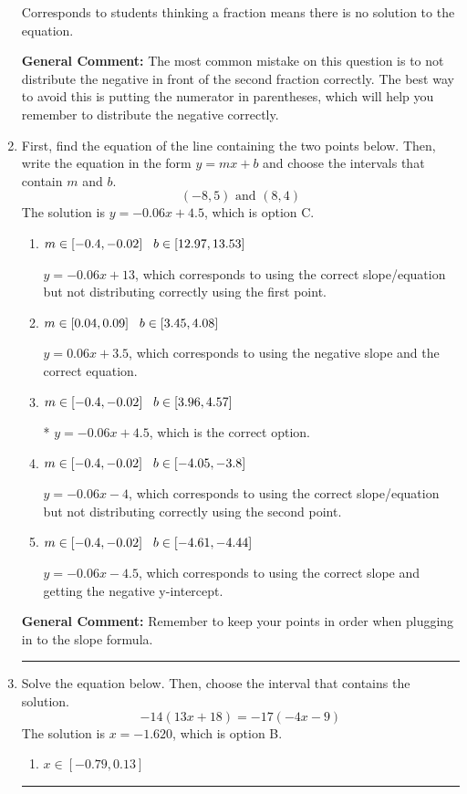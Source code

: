 \documentclass{extbook}[14pt]
\newcommand{\litem}[1]{\item #1

\rule{\textwidth}{0.4pt}}
\begin{document}
\begin{enumerate}
{\begin{enumerate}[label=\Alph*.]
Corresponds to students thinking a fraction means there is no solution to the equation.
\end{enumerate}

\textbf{General Comment:} The most common mistake on this question is to not distribute the negative in front of the second fraction correctly. The best way to avoid this is putting the numerator in parentheses, which will help you remember to distribute the negative correctly.
}
\litem{
First, find the equation of the line containing the two points below. Then, write the equation in the form $ y=mx+b $ and choose the intervals that contain $m$ and $b$.
\[ (-8, 5) \text{ and } (8, 4) \]The solution is \( y = -0.06x + 4.5 \), which is option C.\begin{enumerate}[label=\Alph*.]
\item \( m \in [-0.4, -0.02] \hspace*{3mm} b \in [12.97, 13.53] \)

 $y = -0.06x + 13$, which corresponds to using the correct slope/equation but not distributing correctly using the first point.
\item \( m \in [0.04, 0.09] \hspace*{3mm} b \in [3.45, 4.08] \)

 $y = 0.06x + 3.5$, which corresponds to using the negative slope and the correct equation.
\item \( m \in [-0.4, -0.02] \hspace*{3mm} b \in [3.96, 4.57] \)

* $y = -0.06x + 4.5$, which is the correct option.
\item \( m \in [-0.4, -0.02] \hspace*{3mm} b \in [-4.05, -3.8] \)

 $y = -0.06x -4$, which corresponds to using the correct slope/equation but not distributing correctly using the second point.
\item \( m \in [-0.4, -0.02] \hspace*{3mm} b \in [-4.61, -4.44] \)

 $y = -0.06x -4.5$, which corresponds to using the correct slope and getting the negative y-intercept.
\end{enumerate}

\textbf{General Comment:} Remember to keep your points in order when plugging in to the slope formula.
}
\litem{
Solve the equation below. Then, choose the interval that contains the solution.
\[ -14(13x + 18) = -17(-4x -9) \]The solution is \( x = -1.620 \), which is option B.\begin{enumerate}[label=\Alph*.]
\item \( x \in [-0.79, 0.13] \)


\end{enumerate}}
\end{enumerate}
\end{document}
